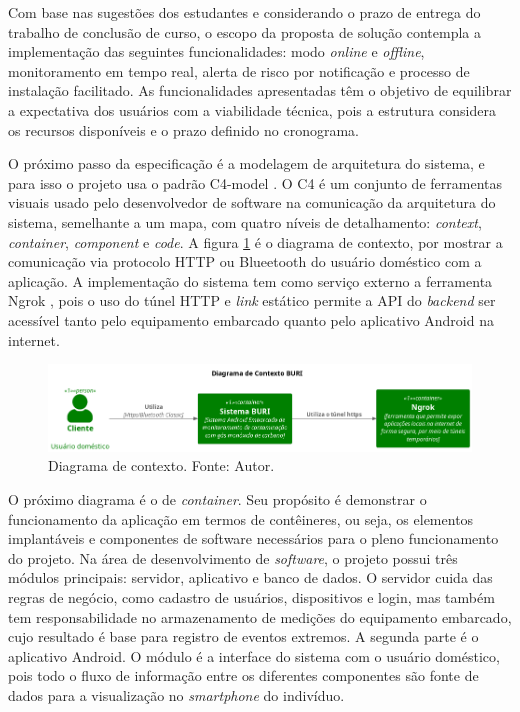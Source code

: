 Com base nas sugestões dos estudantes e considerando o prazo de entrega do trabalho de conclusão de curso, o escopo da proposta de solução contempla a 
implementação das seguintes funcionalidades: modo \textit{online} e \textit{offline}, monitoramento em tempo real, alerta de risco por notificação e processo de instalação facilitado.
As funcionalidades apresentadas têm o objetivo de equilibrar a expectativa dos usuários com a viabilidade técnica, pois a estrutura considera os recursos disponíveis e o prazo definido no 
cronograma.

O próximo passo da especificação é a modelagem de arquitetura do sistema, e para isso o projeto usa o padrão C4-model \cite{c4-model}. O C4 é um conjunto de ferramentas visuais usado pelo 
desenvolvedor de software na comunicação da arquitetura do sistema, semelhante a um mapa, com quatro níveis de detalhamento: \textit{context}, \textit{container}, \textit{component} e \textit{code}. A figura \ref{figContextDiagram} é o 
diagrama de contexto, por mostrar a comunicação via protocolo HTTP ou Blueetooth do usuário doméstico com a aplicação. A implementação do sistema tem como serviço externo a ferramenta Ngrok \cite{ngrok}, pois o uso do túnel HTTP e \textit{link} estático permite a API do \textit{backend} ser acessível tanto pelo equipamento 
embarcado quanto pelo aplicativo Android na internet.

\begin{figure}[ht]
    \centering
    \includegraphics[width=.87\textwidth]{img/context-diagram.png}
    \caption{Diagrama de contexto. Fonte: Autor.}\label{figContextDiagram}
\end{figure}

O próximo diagrama é o de \textit{container}. Seu propósito é demonstrar o funcionamento da aplicação em termos de contêineres, ou seja, os elementos implantáveis
e componentes de software necessários para o pleno funcionamento do projeto. Na área de desenvolvimento de \textit{software}, o projeto possui três módulos principais: servidor, 
aplicativo e banco de dados. O servidor cuida das regras de negócio, como cadastro de usuários, dispositivos e login, mas também tem responsabilidade no 
armazenamento de medições do equipamento embarcado, cujo resultado é base para registro de eventos extremos. A segunda parte é o aplicativo Android. O módulo é a interface do sistema com o usuário doméstico, pois todo o fluxo de informação entre os 
diferentes componentes são fonte de dados para a visualização no \textit{smartphone} do indivíduo.

